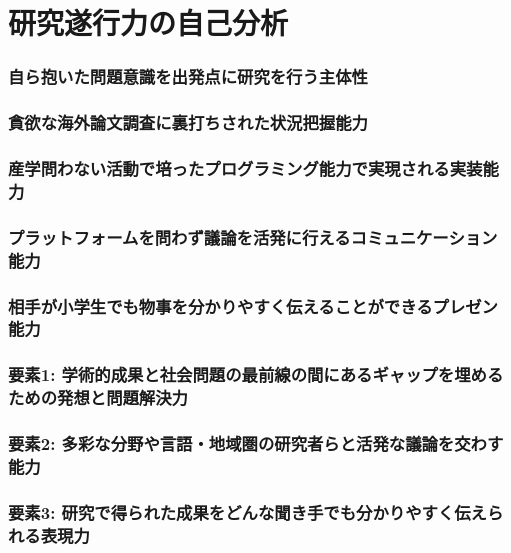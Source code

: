 
\section{研究遂行力の自己分析}

\noindent
{}
\subsubsection*{自ら抱いた問題意識を出発点に研究を行う主体性}

\subsubsection*{貪欲な海外論文調査に裏打ちされた状況把握能力}

\subsubsection*{産学問わない活動で培ったプログラミング能力で実現される実装能力}

\subsubsection*{プラットフォームを問わず議論を活発に行えるコミュニケーション能力}

\subsubsection*{相手が小学生でも物事を分かりやすく伝えることができるプレゼン能力}

\vspace{5mm}
\noindent
{}
\subsubsection*{要素1: 学術的成果と社会問題の最前線の間にあるギャップを埋めるための発想と問題解決力}

\subsubsection*{要素2: 多彩な分野や言語・地域圏の研究者らと活発な議論を交わす能力}

\subsubsection*{要素3: 研究で得られた成果をどんな聞き手でも分かりやすく伝えられる表現力}




